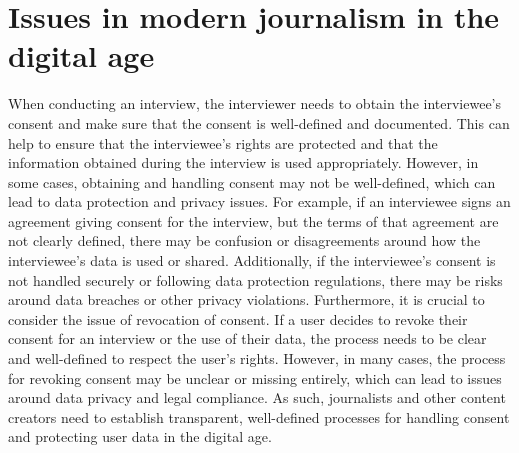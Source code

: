 \documentclass[target=mst,aauheader=]{thud}
\begin{document}
\section{Issues in modern journalism in the digital age}

When conducting an interview, the interviewer needs to obtain the interviewee's consent and make sure that the consent is well-defined and documented. This can help to ensure that the interviewee's rights are protected and that the information obtained during the interview is used appropriately. However, in some cases, obtaining and handling consent may not be well-defined, which can lead to data protection and privacy issues. For example, if an interviewee signs an agreement giving consent for the interview, but the terms of that agreement are not clearly defined, there may be confusion or disagreements around how the interviewee's data is used or shared. Additionally, if the interviewee's consent is not handled securely or following data protection regulations, there may be risks around data breaches or other privacy violations. Furthermore, it is crucial to consider the issue of revocation of consent.
If a user decides to revoke their consent for an interview or the use of their data, the process needs to be clear and well-defined to respect the user's rights. However, in many cases, the process for revoking consent may be unclear or missing entirely, which can lead to issues around data privacy and legal compliance. As such, journalists and other content creators need to establish transparent, well-defined processes for handling consent and protecting user data in the digital age.\par
\end{document}
